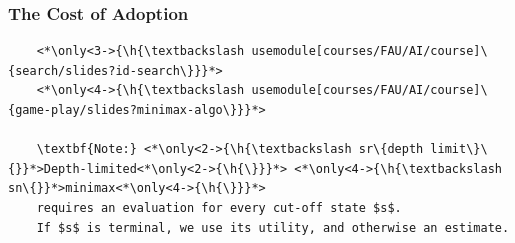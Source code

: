 \documentclass[aspectratio=169]{beamer}
\begin{document}
\begin{frame}[fragile]
    \frametitle{The Cost of Adoption}

    \def\h#1{\colorbox{yellow!50!red!70}{#1}}
    \begin{lstlisting}
    <*\only<3->{\h{\textbackslash usemodule[courses/FAU/AI/course]\{search/slides?id-search\}}}*>
    <*\only<4->{\h{\textbackslash usemodule[courses/FAU/AI/course]\{game-play/slides?minimax-algo\}}}*>

    \textbf{Note:} <*\only<2->{\h{\textbackslash sr\{depth limit\}\{}}*>Depth-limited<*\only<2->{\h{\}}}*> <*\only<4->{\h{\textbackslash sn\{}}*>minimax<*\only<4->{\h{\}}}*>
    requires an evaluation for every cut-off state $s$.
    If $s$ is terminal, we use its utility, and otherwise an estimate.
    \end{lstlisting}

\end{frame}
\end{document}
